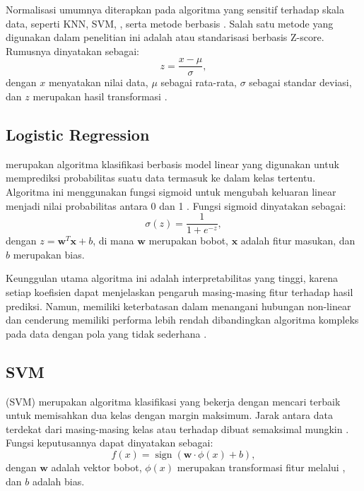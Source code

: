 Normalisasi umumnya diterapkan pada algoritma yang sensitif terhadap skala data, seperti KNN, SVM, , serta metode berbasis . Salah satu metode yang digunakan dalam penelitian ini adalah  atau standarisasi berbasis Z-score. Rumusnya dinyatakan sebagai:
\begin{equation}
 z = \frac{x-\mu}{\sigma},
 \label{eq:zscore}
\end{equation}
dengan $x$ menyatakan nilai data, $\mu$ sebagai rata-rata, $\sigma$ sebagai standar deviasi, dan $z$ merupakan hasil transformasi \cite{ref32}.

\subsection{Logistic Regression}
 merupakan algoritma klasifikasi berbasis model linear yang digunakan untuk memprediksi probabilitas suatu data termasuk ke dalam kelas tertentu. Algoritma ini menggunakan fungsi sigmoid untuk mengubah keluaran linear menjadi nilai probabilitas antara 0 dan 1 \cite{ref11}. Fungsi sigmoid dinyatakan sebagai:
\begin{equation}
 \sigma(z)=\frac{1}{1+e^{-z}},
 \label{eq:sigmoid}
\end{equation}
dengan $z=\mathbf{w}^{T}\mathbf{x}+b$, di mana $\mathbf{w}$ merupakan bobot, $\mathbf{x}$ adalah fitur masukan, dan $b$ merupakan bias.

Keunggulan utama algoritma ini adalah interpretabilitas yang tinggi, karena setiap koefisien dapat menjelaskan pengaruh masing-masing fitur terhadap hasil prediksi. Namun,  memiliki keterbatasan dalam menangani hubungan non-linear dan cenderung memiliki performa lebih rendah dibandingkan algoritma kompleks pada data dengan pola yang tidak sederhana \cite{ref10}.

\subsection{SVM}
 (SVM) merupakan algoritma klasifikasi yang bekerja dengan mencari  terbaik untuk memisahkan dua kelas dengan margin maksimum. Jarak antara data terdekat dari masing-masing kelas atau  terhadap  dibuat semaksimal mungkin \cite{ref11,ref33}. Fungsi keputusannya dapat dinyatakan sebagai:
\begin{equation}
 f(x)=\operatorname{sign}\left(\mathbf{w}\cdot\phi(x)+b\right),
 \label{eq:svm}
\end{equation}
dengan $\mathbf{w}$ adalah vektor bobot, $\phi(x)$ merupakan transformasi fitur melalui , dan $b$ adalah bias.

